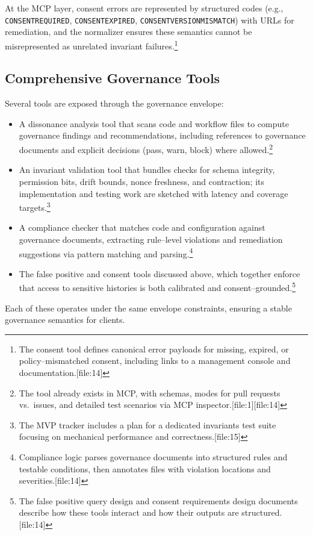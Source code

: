 \documentclass[11pt]{article}
\begin{document}
At the MCP layer, consent errors are represented by structured codes (e.g., \texttt{CONSENTREQUIRED}, \texttt{CONSENTEXPIRED}, \texttt{CONSENTVERSIONMISMATCH}) with URLs for remediation, and the normalizer ensures these semantics cannot be misrepresented as unrelated invariant failures.\footnote{The consent tool defines canonical error payloads for missing, expired, or policy--mismatched consent, including links to a management console and documentation.[file:14]} 

\subsection{Comprehensive Governance Tools}

Several tools are exposed through the governance envelope:
\begin{itemize}[leftmargin=*]
  \item A dissonance analysis tool that scans code and workflow files to compute governance findings and recommendations, including references to governance documents and explicit decisions (pass, warn, block) where allowed.\footnote{The tool already exists in MCP, with schemas, modes for pull requests vs.\ issues, and detailed test scenarios via MCP inspector.[file:1][file:14]} 
  \item An invariant validation tool that bundles checks for schema integrity, permission bits, drift bounds, nonce freshness, and contraction; its implementation and testing work are sketched with latency and coverage targets.\footnote{The MVP tracker includes a plan for a dedicated invariants test suite focusing on mechanical performance and correctness.[file:15]} 
  \item A compliance checker that matches code and configuration against governance documents, extracting rule--level violations and remediation suggestions via pattern matching and parsing.\footnote{Compliance logic parses governance documents into structured rules and testable conditions, then annotates files with violation locations and severities.[file:14]} 
  \item The false positive and consent tools discussed above, which together enforce that access to sensitive histories is both calibrated and consent--grounded.\footnote{The false positive query design and consent requirements design documents describe how these tools interact and how their outputs are structured.[file:14]} 
\end{itemize}

Each of these operates under the same envelope constraints, ensuring a stable governance semantics for clients.
\end{document}
